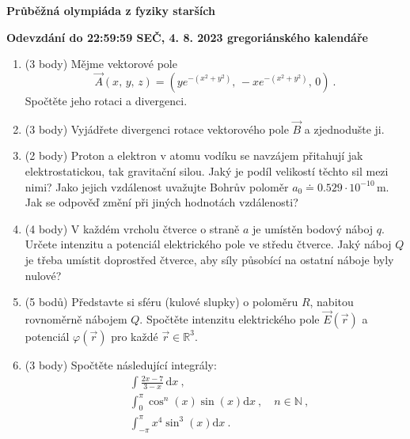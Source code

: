 \documentclass[12pt,a4paper]{article}
\begin{document}
\begin{center}
    \textbf{\Large Průběžná olympiáda z fyziky starších}
    \vspace{1em}
    
    \textbf{Odevzdání do 22:59:59 SEČ, 4. 8. 2023 gregoriánského kalendáře}
\end{center}
\vspace{1em}

\begin{enumerate}[label=\arabic*)]

\item (3 body) Mějme vektorové pole
\begin{equation*}
    \vec{A}\left(x,\, y,\, z\right) = \left(ye^{-\left(x^2+y^2\right)},\, -xe^{-\left(x^2+y^2\right)},\, 0\right) ~.
\end{equation*}
Spočtěte jeho rotaci a divergenci.

\item (3 body)
Vyjádřete divergenci rotace vektorového pole $\vec{B}$ a zjednodušte ji.

\item (2 body) Proton a elektron v atomu vodíku se navzájem přitahují jak elektrostatickou, tak gravitační silou. Jaký je podíl velikostí těchto sil mezi nimi? Jako jejich vzdálenost uvažujte Bohrův poloměr $a_0 \doteq 0.529\cdot 10^{-10}\,\mathrm{m}$. Jak se odpověď změní při jiných hodnotách vzdálenosti?

\item (4 body) V každém vrcholu čtverce o straně $a$ je umístěn bodový náboj $q$. Určete intenzitu a potenciál elektrického pole ve středu čtverce. Jaký náboj $Q$ je třeba umístit doprostřed čtverce, aby síly působící na ostatní náboje byly nulové?

\item (5 bodů) Představte si sféru (kulové slupky) o poloměru $R$, nabitou rovnoměrně nábojem $Q$. Spočtěte intenzitu elektrického pole $\vec{E}\left(\vec{r}\right)$ a potenciál $\varphi\left(\vec{r}\right)$ pro každé $\vec{r}\in\mathbb{R}^3$.

\item (3 body) Spočtěte následující integrály:
\begin{align*}
    &\int \frac{2x-7}{3-x}\,\mathrm{d}x ~,\\
    &\int_0^\pi \cos^n\left(x\right)\sin\left(x\right)\mathrm{d}x ~,\quad n\in\mathbb{N} ~,\\
    &\int_{-\pi}^{\pi} x^4\sin^3\left(x\right)\mathrm{d}x ~.
\end{align*}

\end{enumerate}

\iffalse

\newpage
\begin{center}
    \textbf{\Large Průběžná olympiáda z fyziky starších}
    \vspace{1em}
    
    \textbf{Odevzdání do 22:59:59, 6. 8. 2023 gregoriánského kalendáře}
\end{center}

\begin{enumerate}[resume,label=\arabic*)]

\item (5 bodů) Další úloha.

\end{enumerate}

\fi
\end{document}
